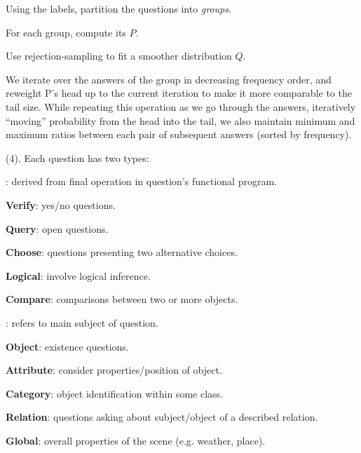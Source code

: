\documentclass[11pt]{article}
\begin{document}
\begin{compactenum}
\begin{compactenum}
		\item Using the labels, partition the questions into \textit{groups}. 
		
		\item For each group, compute its  $P$. 
		
		\item Use rejection-sampling to fit a smoother distribution $Q$.
		\begin{myquote}[-0.2em]
			We iterate over the answers of the group in decreasing frequency order, and reweight P's head up to the current iteration to make it more comparable to the tail size. While repeating this operation as we go through the answers, iteratively ``moving'' probability from the head into the tail, we also maintain minimum and maximum ratios between each pair of subsequent answers (sorted by frequency).
		\end{myquote}
	\end{compactenum}
\end{compactenum}



 (4). Each question has two types:
\begin{compactitem}
	\item {}: derived from final operation in question's functional program. 
	\begin{compactitem}
		\item \textbf{Verify}: yes/no questions.
		\item \textbf{Query}: open questions.
		\item \textbf{Choose}: questions presenting two alternative choices.
		\item \textbf{Logical}: involve logical inference. 
		\item \textbf{Compare}: comparisons between two or more objects.
	\end{compactitem}

	\item {}: refers to main subject of question. 
	\begin{compactitem}
		\item \textbf{Object}: existence questions.
		\item \textbf{Attribute}: consider properties/position of object.
		\item \textbf{Category}: object identification within some class.
		\item \textbf{Relation}: questions asking about subject/object of a described relation.
		\item \textbf{Global}: overall properties of the scene (e.g. weather, place).
	\end{compactitem}
\end{compactitem}
\end{document}
